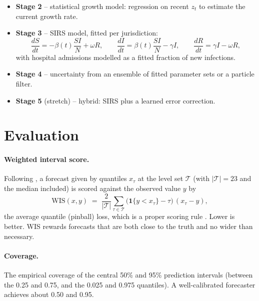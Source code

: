 \documentclass[11pt]{article}
\begin{document}
\begin{note}
\begin{itemize}[nosep]
  \item \textbf{Stage 2} -- statistical growth model: regression on recent $z_t$ to
        estimate the current growth rate.
  \item \textbf{Stage 3} -- SIRS model, fitted per jurisdiction:
  \[
    \frac{dS}{dt} = -\beta(t)\frac{SI}{N} + \omega R,\qquad
    \frac{dI}{dt} = \beta(t)\frac{SI}{N} - \gamma I,\qquad
    \frac{dR}{dt} = \gamma I - \omega R,
  \]
  with hospital admissions modelled as a fitted fraction of new infections.
  \item \textbf{Stage 4} -- uncertainty from an ensemble of fitted parameter sets or a
        particle filter.
  \item \textbf{Stage 5} (stretch) -- hybrid: SIRS plus a learned error correction.
\end{itemize}
\end{note}

\section{Evaluation}
\label{sec:evaluation}

\paragraph{Weighted interval score.} Following \citet{bracher2021}, a forecast given by
quantiles $x_\tau$ at the level set $\mathcal{T}$ (with $|\mathcal{T}| = 23$ and the
median included) is scored against the observed value $y$ by
\begin{equation}
  \mathrm{WIS}(x, y) \;=\; \frac{2}{|\mathcal{T}|}\sum_{\tau\in\mathcal{T}}
     \big(\mathbf{1}\{y < x_\tau\} - \tau\big)\,(x_\tau - y),
  \label{eq:wis}
\end{equation}
the average quantile (pinball) loss, which is a proper scoring rule
\citep{gneiting2007}. Lower is better. WIS rewards forecasts that are both close to the
truth and no wider than necessary.

\paragraph{Coverage.} The empirical coverage of the central 50\% and 95\% prediction
intervals (between the 0.25 and 0.75, and the 0.025 and 0.975 quantiles). A
well-calibrated forecaster achieves about 0.50 and 0.95.
\end{document}
